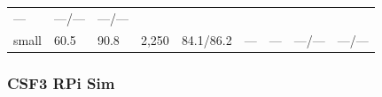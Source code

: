 \documentclass[
  9pt, a4paper, landscape]{article}
\begin{document}
\begin{longtable}[]{@{}lllllllll@{}}
\begin{minipage}[t]{0.08\columnwidth}
---\strut
\end{minipage} & \begin{minipage}[t]{0.08\columnwidth}\raggedright
---/---\strut
\end{minipage} & \begin{minipage}[t]{0.08\columnwidth}\raggedright
---/---\strut
\end{minipage}\tabularnewline
\begin{minipage}[t]{0.08\columnwidth}\raggedright
small\strut
\end{minipage} & \begin{minipage}[t]{0.08\columnwidth}\raggedright
60.5\strut
\end{minipage} & \begin{minipage}[t]{0.08\columnwidth}\raggedright
90.8\strut
\end{minipage} & \begin{minipage}[t]{0.08\columnwidth}\raggedright
2,250\strut
\end{minipage} & \begin{minipage}[t]{0.08\columnwidth}\raggedright
84.1/86.2\strut
\end{minipage} & \begin{minipage}[t]{0.08\columnwidth}\raggedright
---\strut
\end{minipage} & \begin{minipage}[t]{0.08\columnwidth}\raggedright
---\strut
\end{minipage} & \begin{minipage}[t]{0.08\columnwidth}\raggedright
---/---\strut
\end{minipage} & \begin{minipage}[t]{0.08\columnwidth}\raggedright
---/---\strut
\end{minipage}\tabularnewline
\bottomrule
\end{longtable}

\hypertarget{csf3-rpi-sim}{%
\subsubsection{CSF3 RPi Sim}\label{csf3-rpi-sim}}
\end{document}
